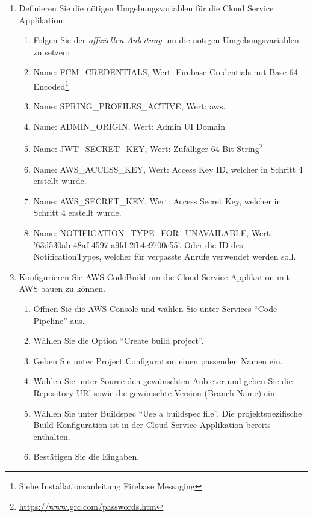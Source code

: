 \begin{enumerate}
    \item Definieren Sie die nötigen Umgebungsvariablen für die Cloud Service Applikation:
    \begin{enumerate}
        \item Folgen Sie der \href{https://docs.aws.amazon.com/elasticbeanstalk/latest/dg/environments-cfg-softwaresettings.html}{\textit{offiziellen Anleitung}}\cite{aws-elastic-env} um die nötigen Umgebungsvariablen zu setzen:
        \item Name: FCM\_CREDENTIALS, Wert: Firebase Credentials mit Base 64 Encoded\footnote{Siehe Installationsanleitung Firebase Messaging}
        \item Name: SPRING\_PROFILES\_ACTIVE, Wert: aws.
        \item Name: ADMIN\_ORIGIN, Wert: Admin UI Domain
        \item Name: JWT\_SECRET\_KEY, Wert: Zufälliger 64 Bit String\footnote{\url{https://www.grc.com/passwords.htm}}
        \item Name: AWS\_ACCESS\_KEY, Wert: Access Key ID, welcher in Schritt 4 erstellt wurde.
        \item Name: AWS\_SECRET\_KEY, Wert: Access Secret Key, welcher in Schritt 4 erstellt wurde.
        \item Name: NOTIFICATION\_TYPE\_FOR\_UNAVAILABLE, Wert: '63d530ab-48af-4597-a9fd-2fb4c9700c55'. Oder die ID des NotificationTypes, welcher für verpasste Anrufe verwendet werden soll.
    \end{enumerate}
    \item Konfigurieren Sie AWS CodeBuild um die Cloud Service Applikation mit AWS bauen zu können.
    \begin{enumerate}
        \item Öffnen Sie die AWS Console und wählen Sie unter Services ``Code Pipeline'' aus.
        \item Wählen Sie die Option ``Create build project''.
        \item Geben Sie unter Project Configuration einen passenden Namen ein.
        \item Wählen Sie unter Source den gewünschten Anbieter und geben Sie die Repository URl sowie die gewünschte Version (Branch Name) ein.
        \item Wählen Sie unter Buildspec ``Use a buildspec file''. Die projektspezifische Build Konfiguration ist in der Cloud Service Applikation bereits enthalten.
        \item Bestätigen Sie die Eingaben.
    \end{enumerate}

\end{enumerate}
